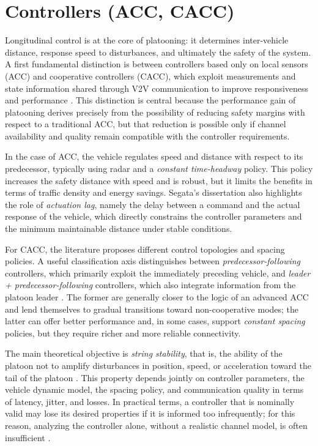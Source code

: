 \section{Controllers (ACC, CACC)}
\label{sec:sota_controller}

Longitudinal control is at the core of platooning: it determines inter-vehicle distance, response speed to disturbances, and ultimately the safety of the system. A first fundamental distinction is between controllers based only on local sensors (ACC) and cooperative controllers (CACC), which exploit measurements and state information shared through V2V communication to improve responsiveness and performance \cite{ploeg2011design,oncu2014cooperative,segata2016safe}. This distinction is central because the performance gain of platooning derives precisely from the possibility of reducing safety margins with respect to a traditional ACC, but that reduction is possible only if channel availability and quality remain compatible with the controller requirements.

In the case of ACC, the vehicle regulates speed and distance with respect to its predecessor, typically using radar and a \emph{constant time-headway} policy. This policy increases the safety distance with speed and is robust, but it limits the benefits in terms of traffic density and energy savings. Segata's dissertation \cite{segata2016safe} also highlights the role of \emph{actuation lag}, namely the delay between a command and the actual response of the vehicle, which directly constrains the controller parameters and the minimum maintainable distance under stable conditions.

For CACC, the literature proposes different control topologies and spacing policies. A useful classification axis distinguishes between \emph{predecessor-following} controllers, which primarily exploit the immediately preceding vehicle, and \emph{leader + predecessor-following} controllers, which also integrate information from the platoon leader \cite{ploeg2011design,segata2016safe}. The former are generally closer to the logic of an advanced ACC and lend themselves to gradual transitions toward non-cooperative modes; the latter can offer better performance and, in some cases, support \emph{constant spacing} policies, but they require richer and more reliable connectivity.

The main theoretical objective is \emph{string stability}, that is, the ability of the platoon not to amplify disturbances in position, speed, or acceleration toward the tail of the platoon \cite{besselink2017string,segata2016safe}. This property depends jointly on controller parameters, the vehicle dynamic model, the spacing policy, and communication quality in terms of latency, jitter, and losses. In practical terms, a controller that is nominally valid may lose its desired properties if it is informed too infrequently; for this reason, analyzing the controller alone, without a realistic channel model, is often insufficient \cite{giordano2019joint}.

